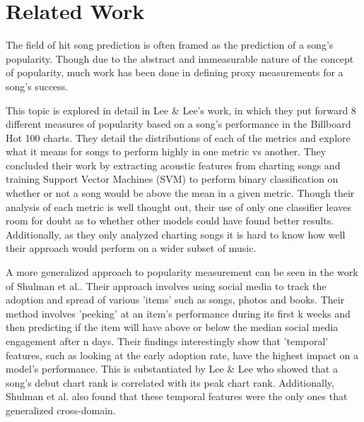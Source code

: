 \documentclass[conference]{IEEEtran}
\begin{document}
\section{Related Work}
The field of hit song prediction is often framed as the prediction of a song's popularity. Though due to the abstract and immeasurable nature of the concept of popularity, much work has been done in defining proxy measurements for a song's success.

This topic is explored in detail in Lee \& Lee's work\cite{b3}, in which they put forward 8 different measures of popularity based on a song's performance in the Billboard Hot 100 charts. They detail the distributions of each of the metrics and explore what it means for songs to perform highly in one metric vs another. They concluded their work by extracting acoustic features from charting songs and training Support Vector Machines (SVM) to perform binary classification on whether or not a song would be above the mean in a given metric. Though their analysis of each metric is well thought out, their use of only one classifier leaves room for doubt as to whether other models could have found better results. Additionally, as they only analyzed charting songs it is hard to know how well their approach would perform on a wider subset of music.

A more generalized approach to popularity measurement can be seen in the work of Shulman et al.\cite{b7}. Their approach involves using social media to track the adoption and spread of various 'items' such as songs, photos and books. Their method involves 'peeking' at an item's performance during its first k weeks and then predicting if the item will have above or below the median social media engagement after n days. Their findings interestingly show that 'temporal' features, such as looking at the early adoption rate, have the highest impact on a model's performance. This is substantiated by Lee \& Lee\cite{b3} who showed that a song's debut chart rank is correlated with its peak chart rank. Additionally, Shulman et al.\cite{b7} also found that these temporal features were the only ones that generalized cross-domain.
\end{document}
